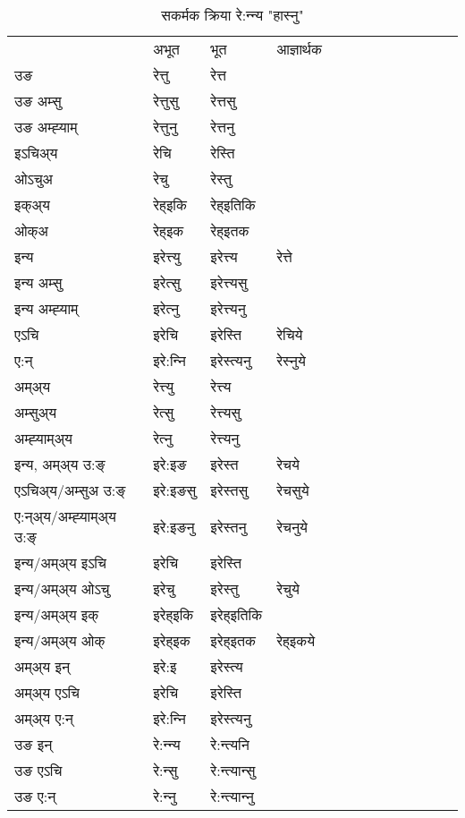\begin{table}[H]
\label{ett.vt} \centering
\caption{सकर्मक क्रिया  रे:न्‍न्य  "हास्नु"  }
\begin{tabular}{l|l|l|l|l|l|l|l|l|l|l|l|l}  \toprule
&अभूत & भूत & आज्ञार्थक \\ 
उङ &रेत्तु &रेत्त \\ 
उङ अम्सु&रेत्तुसु &रेत्तसु \\ 
उङ अम्ह्‍याम्&रेत्तुनु &रेत्तनु \\ 
इऽचिअ्य &रेचि &रेस्ति   \\ 
ओऽचुअ        &रेचु &रेस्तु   \\ 
इक्अ्य&रेह्इकि &रेह्इतिकि   \\ 
ओक्अ &रेह्इक &रेह्इतक   \\ 
इन्य & इरेत्त्यु  & इरेत्त्य &रेत्ते  \\ 
इन्य अम्सु& इरेत्सु  & इरेत्त्यसु   \\ 
इन्य अम्ह्‍याम्& इरेत्‍नु  & इरेत्त्यनु   \\ 
एऽचि & इरेचि & इरेस्ति &रेचिये    \\ 
ए:न् & इरे:न्‍नि  & इरेस्त्यनु &रेस्‍नुये  \\ 
अम्अ्य & रेत्त्यु  & रेत्त्य  \\ 
अम्सुअ्य & रेत्सु & रेत्त्यसु  \\ 
अम्ह्‍याम्अ्य & रेत्‍नु  & रेत्त्यनु \\ 
\midrule
इन्य, अम्अ्य उ:ङ्‌ &इरे:इङ &इरेस्त &रेचये \\ 
एऽचिअ्य/अम्सुअ उ:ङ्‌ &इरे:इङसु &इरेस्तसु &रेचसुये \\ 
ए:न्अ्य/अम्ह्‍याम्अ्य उ:ङ्‌ &इरे:इङनु &इरेस्तनु &रेचनुये \\ 
इन्य/अम्अ्य इऽचि &इरेचि &इरेस्ति    \\ 
इन्य/अम्अ्य ओऽचु &इरेचु &इरेस्तु  &रेचुये  \\ 
इन्य/अम्अ्य इक् &इरेह्इकि &इरेह्इतिकि   \\ 
इन्य/अम्अ्य ओक् &इरेह्इक &इरेह्इतक  &रेह्इकये  \\ 
अम्अ्य इन् & इरे:इ & इरेस्त्य   \\ 
अम्अ्य एऽचि & इरेचि & इरेस्ति    \\ 
अम्अ्य ए:न् & इरे:न्‍नि  & इरेस्त्यनु  \\ 
\midrule
उङ इन् & रे:न्‍न्य  & रे:न्त्यनि  \\ 
उङ एऽचि & रे:न्सु  & रे:न्त्यान्सु   \\ 
उङ ए:न्& रे:न्‍नु  & रे:न्त्यान्‍नु   \\ 
\bottomrule
\end{tabular}
\end{table}


